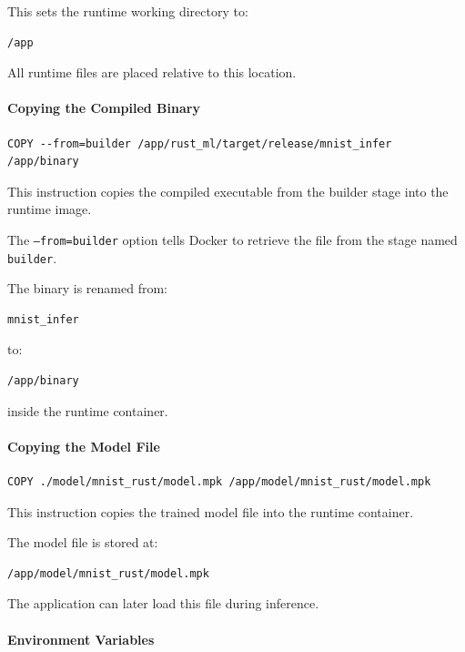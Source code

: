 \documentclass{ieeeaccess}
\begin{document}
This sets the runtime working directory to:

\begin{lstlisting}
/app
\end{lstlisting}

All runtime files are placed relative to this location.

\paragraph{Copying the Compiled Binary}

\begin{lstlisting}
COPY --from=builder /app/rust_ml/target/release/mnist_infer /app/binary
\end{lstlisting}

This instruction copies the compiled executable from the builder stage into the runtime image.

The \texttt{--from=builder} option tells Docker to retrieve the file from the stage named \texttt{builder}.

The binary is renamed from:

\begin{lstlisting}
mnist_infer
\end{lstlisting}

to:

\begin{lstlisting}
/app/binary
\end{lstlisting}

inside the runtime container.

\paragraph{Copying the Model File}

\begin{lstlisting}
COPY ./model/mnist_rust/model.mpk /app/model/mnist_rust/model.mpk
\end{lstlisting}

This instruction copies the trained model file into the runtime container.

The model file is stored at:

\begin{lstlisting}
/app/model/mnist_rust/model.mpk
\end{lstlisting}

The application can later load this file during inference.

\paragraph{Environment Variables}
\end{document}
